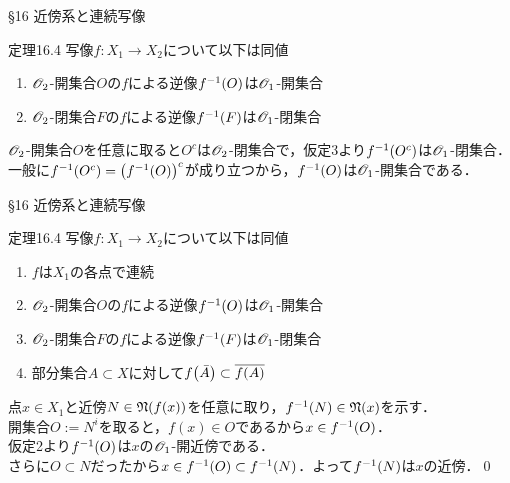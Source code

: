 \documentclass[uplatex,a4paper,dvipdfmx,aspectratio=169,11pt]{beamer}
\begin{document}
\begin{frame}[fragile]{\S 16 近傍系と連続写像}
    \begin{block}{定理16.4}
        写像$f \colon X_1 \to X_2$について以下は同値
        \begin{enumerate}
            \item[2.] $\mathscr{O}_2$-開集合$O$の$f$による逆像$f^{\mathrm{-1}}(O)$は$\mathscr{O}_1$-開集合
            \item[3.] $\mathscr{O}_2$-閉集合$F$の$f$による逆像$f^{\mathrm{-1}}(F)$は$\mathscr{O}_1$-閉集合
        \end{enumerate}
    \end{block}

    \begin{description}[$4 \Rightarrow 3$:]
        \item[$3 \Rightarrow 2$:] 
            $\mathscr{O}_2$-開集合$O$を任意に取ると$O^c$は$\mathscr{O}_2$-閉集合で，仮定3より$f^{\mathrm{-1}}(O^c)$は$\mathscr{O}_1$-閉集合．\\
            一般に$f^{\mathrm{-1}}(O^c) = \qty(f^{\mathrm{-1}}(O))^c$が成り立つから，$f^{\mathrm{-1}}(O)$は$\mathscr{O}_1$-開集合である．
    \end{description}
\end{frame}

\begin{frame}[fragile]{\S 16 近傍系と連続写像}
    \begin{block}{定理16.4}
        写像$f \colon X_1 \to X_2$について以下は同値
        \begin{enumerate}
            \item $f$は$X_1$の各点で連続
            \item[2.] $\mathscr{O}_2$-開集合$O$の$f$による逆像$f^{\mathrm{-1}}(O)$は$\mathscr{O}_1$-開集合
            \item[3.] $\mathscr{O}_2$-閉集合$F$の$f$による逆像$f^{\mathrm{-1}}(F)$は$\mathscr{O}_1$-閉集合
            \item[4.] 部分集合$A \subset X$に対して$f \qty(\bar A) \subset \overline{f(A)}$
        \end{enumerate}
    \end{block}

    \begin{description}[$4 \Rightarrow 3$:]
        \item[$2 \Rightarrow 1$:] 
            点$x \in X_1$と近傍$N \in \mathord{\mathfrak{N}}\qty(f(x))$を任意に取り，$f^{\mathrm{-1}}(N) \in \mathord{\mathfrak{N}}\qty(x)$を示す．\\
            開集合$O := N^i$を取ると，$f(x) \in O$であるから$x \in f^{\mathrm{-1}}(O)$．\\仮定2より$f^{\mathrm{-1}}(O)$は$x$の$\mathscr{O}_1$-開近傍である．\\
            さらに$O \subset N$だったから$x \in f^{\mathrm{-1}}(O) \subset f^{\mathrm{-1}}(N)$．よって$f^{\mathrm{-1}}(N)$は$x$の近傍．\qed
    \end{description}
\end{frame}
\end{document}
